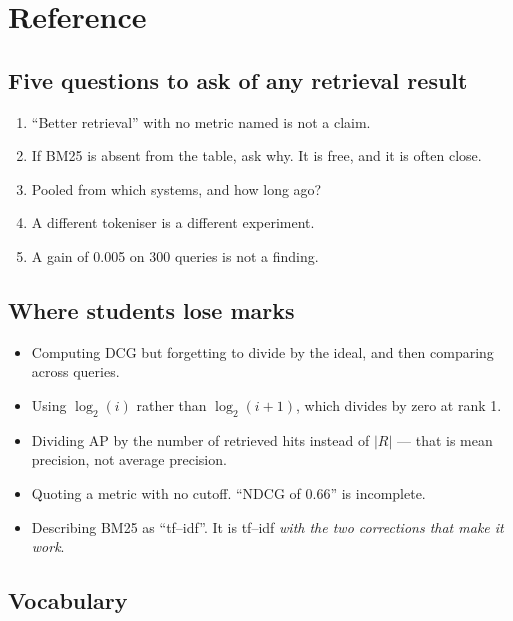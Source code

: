 \documentclass[11pt,a4paper]{article}
\begin{document}
\section{Reference}

\subsection{Five questions to ask of any retrieval result}

\begin{enumerate}[leftmargin=*]
  \item {} ``Better retrieval'' with no
        metric named is not a claim.
  \item {} If BM25 is absent from the table, ask
        why. It is free, and it is often close.
  \item {} Pooled from which systems, and
        how long ago?
  \item {} A different
        tokeniser is a different experiment.
  \item {}
        A gain of 0.005 on 300 queries is not a finding.
\end{enumerate}

\subsection{Where students lose marks}

\begin{itemize}[leftmargin=*,nosep]
  \item Computing DCG but forgetting to divide by the ideal, and then comparing
        across queries.
  \item Using $\log_2(i)$ rather than $\log_2(i+1)$, which divides by zero at
        rank 1.
  \item Dividing AP by the number of retrieved hits instead of $|R|$ --- that
        is mean precision, not average precision.
  \item Quoting a metric with no cutoff. ``NDCG of 0.66'' is incomplete.
  \item Describing BM25 as ``tf--idf''. It is tf--idf \emph{with the two
        corrections that make it work}.
\end{itemize}

\subsection{Vocabulary}
\end{document}
